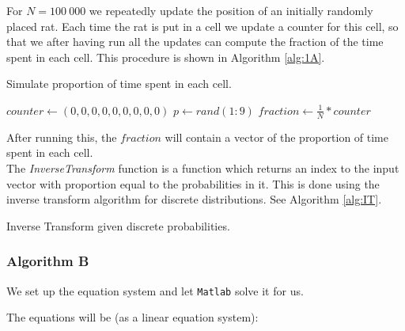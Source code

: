 For $N = 100\ 000$ we repeatedly update the position of an initially randomly placed rat. Each time the rat is put in a cell we update a counter for this cell, so that we after having run all the updates can compute the fraction of the time spent in each cell. This procedure is shown in Algorithm \ref{alg:1A}.

\begin{algorithm}[H]
    \label{alg:1A}
    \caption{Simulate proportion of time spent in each cell.}
    $counter \gets (0, 0, 0, 0, 0, 0, 0, 0, 0)$ \;
    $p \gets rand(1:9)$ \;
    $fraction \gets \frac{1}{N} * counter$
\end{algorithm}

After running this, the $fraction$ will contain a vector of the proportion of time spent in each cell.
\\ 

The \textit{InverseTransform} function is a function which returns an index to the input vector with proportion equal to the probabilities in it.
This is done using the inverse transform algorithm for discrete distributions. See Algorithm \ref{alg:IT}.

\begin{algorithm}[H]
    \label{alg:IT}
    \caption{Inverse Transform given discrete probabilities.}
\end{algorithm}


\subsubsection{Algorithm B}
\label{sec:alg1B}

We set up the equation system and let \texttt{Matlab} solve it for us. 

The equations will be (as a linear equation system): 

